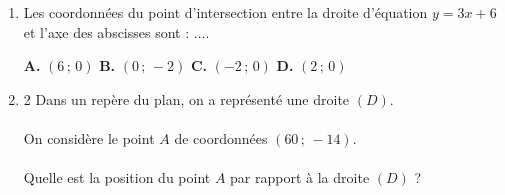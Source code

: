 \documentclass[a4paper,11pt]{article}
\begin{document}
\begin{seance}{} %

\begin{enumerate}
\item Les coordonnées du point d'intersection
    entre la droite d'équation $y=3x+6$ et l'axe des abscisses sont :  ....

\medskip
\begin{center}
\textbf{\textcolor{Couleur1}{A.}} $(6\,;\,0)$ \qquad \textbf{\textcolor{Couleur1}{B.}} $(0\,;\,-2)$ \qquad \textbf{\textcolor{Couleur1}{C.}} $(-2\,;\,0)$ \qquad \textbf{\textcolor{Couleur1}{D.}} $(2\,;\,0)$
\end{center}


\item \begin{multicols}{2}
    Dans un repère du plan, on a représenté une droite $(D)$.\\
\\      On considère le point $A$ de coordonnées $(60\,;\,-14)$.\\
\\      Quelle est la position du point $A$ par rapport à la droite $(D)$ ?

    \begin{tikzpicture}[baseline,scale = 0.5]


\end{tikzpicture}
\end{multicols}
\end{enumerate}
\end{seance}
\end{document}

